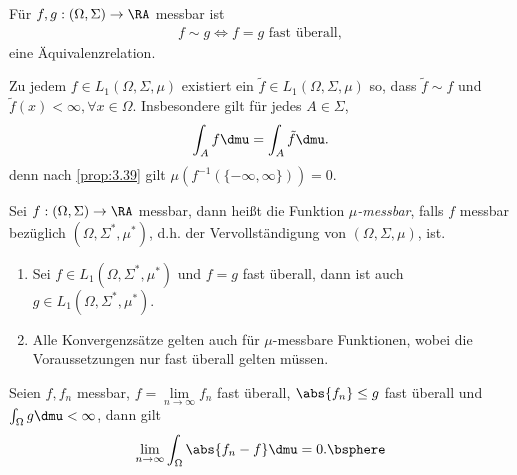 \begin{bem}
\label{bem:3.41}
Für $f,g:(\Omega,\Sigma)\to\RA$ messbar ist
\begin{align*}
f\sim g \Leftrightarrow f = g \text{ fast überall},
\end{align*}
eine Äquivalenzrelation.

Zu jedem $f\in L_1(\Omega,\Sigma,\mu)$ existiert ein
$\tilde{f}\in L_1(\Omega,\Sigma,\mu)$ so, dass $\tilde{f}\sim f$ und
$\tilde{f}(x) <\infty, \forall x\in\Omega$. Insbesondere gilt für jedes $A\in\Sigma$,
\begin{align*}
\int_A f\dmu = \int_A \tilde{f}\dmu.
\end{align*}
denn nach \ref{prop:3.39} gilt $\mu(f^{-1}(\{-\infty,\infty\})) = 0$.\maphere
\end{bem}

\begin{defn}
\label{defn:3.42}
Sei $f:(\Omega,\Sigma)\to\RA$ messbar, dann heißt die Funktion
\emph{$\mu$-messbar}, falls $f$ messbar bezüglich
$(\Omega,\Sigma^*,\mu^*)$, d.h. der Vervollständigung von
$(\Omega,\Sigma,\mu)$, ist.\fishhere
\end{defn}

\begin{bem}
\label{bem:3.43}
\begin{enumerate}[label=\arabic{*}.)]
  \item Sei $f\in L_1(\Omega,\Sigma^*,\mu^*)$ und $f=g$ fast überall, dann ist
  auch $g\in L_1(\Omega,\Sigma^*,\mu^*)$.
  \item Alle Konvergenzsätze gelten auch für $\mu$-messbare Funktionen, wobei
  die Voraussetzungen nur fast überall gelten müssen.\maphere
\end{enumerate}
\end{bem}

\begin{bspn}
Seien $f,f_n$ messbar, $f=\lim\limits_{n\to\infty} f_n$ fast überall,
$\abs{f_n}\le g$ fast überall und $\int_\Omega g \dmu < \infty$, dann gilt
\begin{align*}
\lim\limits_{n\to\infty} \int_\Omega \abs{f_n-f}\dmu = 0.\bsphere
\end{align*}
\end{bspn}

